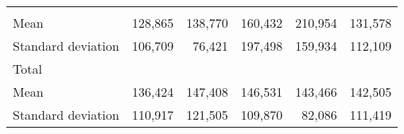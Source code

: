 \begin{tabular}{llllll}
  \multicolumn{1}{|r}{} &
  \multicolumn{1}{r}{} &
  \multicolumn{1}{r}{} &
  \multicolumn{1}{r}{} &
  \multicolumn{1}{r}{} \\
\multicolumn{1}{l}{\hspace{4em}Mean} &
  \multicolumn{1}{|r}{128,865} &
  \multicolumn{1}{r}{138,770} &
  \multicolumn{1}{r}{160,432} &
  \multicolumn{1}{r}{210,954} &
  \multicolumn{1}{r}{131,578} \\
\multicolumn{1}{l}{\hspace{4em}Standard deviation} &
  \multicolumn{1}{|r}{106,709} &
  \multicolumn{1}{r}{76,421} &
  \multicolumn{1}{r}{197,498} &
  \multicolumn{1}{r}{159,934} &
  \multicolumn{1}{r}{112,109} \\
\multicolumn{1}{l}{\hspace{3em}Total} &
  \multicolumn{1}{|r}{} &
  \multicolumn{1}{r}{} &
  \multicolumn{1}{r}{} &
  \multicolumn{1}{r}{} &
  \multicolumn{1}{r}{} \\
\multicolumn{1}{l}{\hspace{4em}Mean} &
  \multicolumn{1}{|r}{136,424} &
  \multicolumn{1}{r}{147,408} &
  \multicolumn{1}{r}{146,531} &
  \multicolumn{1}{r}{143,466} &
  \multicolumn{1}{r}{142,505} \\
\multicolumn{1}{l}{\hspace{4em}Standard deviation} &
  \multicolumn{1}{|r}{110,917} &
  \multicolumn{1}{r}{121,505} &
  \multicolumn{1}{r}{109,870} &
  \multicolumn{1}{r}{82,086} &
  \multicolumn{1}{r}{111,419} \\
\cline{1-6}
\end{tabular}


